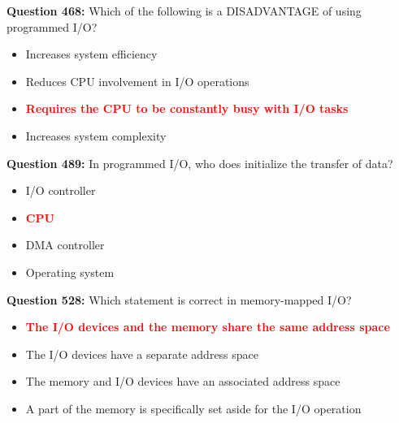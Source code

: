 \documentclass[12pt,a4paper]{article}
\begin{document}
\vspace{0.5cm}

\textbf{Question 468:} Which of the following is a DISADVANTAGE of using programmed I/O?

\begin{itemize}
    \item[\textbf{A.}] Increases system efficiency
    \item[\textbf{B.}] Reduces CPU involvement in I/O operations
    \item[\textbf{C.}] \textcolor{red}{\textbf{Requires the CPU to be constantly busy with I/O tasks}}
    \item[\textbf{D.}] Increases system complexity
\end{itemize}

\vspace{0.5cm}

\vspace{0.5cm}

\textbf{Question 489:} In programmed I/O, who does initialize the transfer of data?

\begin{itemize}
    \item[\textbf{A.}] I/O controller
    \item[\textbf{B.}] \textcolor{red}{\textbf{CPU}}
    \item[\textbf{C.}] DMA controller
    \item[\textbf{D.}] Operating system
\end{itemize}

\vspace{0.5cm}

\vspace{0.5cm}

\textbf{Question 528:} Which statement is correct in memory-mapped I/O?

\begin{itemize}
    \item[\textbf{A.}] \textcolor{red}{\textbf{The I/O devices and the memory share the same address space}}
    \item[\textbf{B.}] The I/O devices have a separate address space
    \item[\textbf{C.}] The memory and I/O devices have an associated address space
    \item[\textbf{D.}] A part of the memory is specifically set aside for the I/O operation
\end{itemize}

\vspace{0.5cm}
\end{document}
